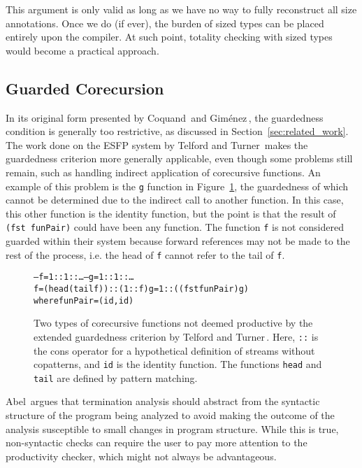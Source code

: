 This argument is only valid as long as we have no way to fully reconstruct all size annotations. Once we do (if ever), the burden of sized types can be placed entirely upon the compiler. At such point, totality checking with sized types would become a practical approach.

\subsection{Guarded Corecursion}
\label{sec:guarded_cored}
In its original form presented by Coquand\,\citep{Coquand94} and Gim\'{e}nez\,\citep{Gimenez95}, the guardedness condition is generally too restrictive, as discussed in Section~\ref{sec:related_work}. The work done on the ESFP system by Telford and Turner\,\citep{Telford97ensuringstreams,Telford98ensuringthe} makes the guardedness criterion more generally applicable, even though some problems still remain, such as handling indirect application of corecursive functions. An example of this problem is the \texttt{g} function in Figure~\ref{fig:TelfordTurnerProblems}, the guardedness of which cannot be determined due to the indirect call to another function. In this case, this other function is the identity function, but the point is that the result of \texttt{(fst~funPair)} could have been any function. The function \texttt{f} is not considered guarded within their system because forward references may not be made to the rest of the process, i.e. the head of \texttt{f} cannot refer to the tail of \texttt{f}.

\begin{figure}
\begin{alltt}
-- f = 1 :: 1 :: \ldots                            -- g = 1 :: 1 :: \ldots
f = (head (tail f)) :: (1 :: f)                 g = 1 :: ((fst funPair) g)
                                                where funPair = (id, id)
\end{alltt}
\caption{Two types of corecursive functions not deemed productive by the extended guardedness criterion by Telford and Turner\,\citep[Section~6.3]{Telford98ensuringthe}. Here, \texttt{::} is the cons operator for a hypothetical definition of streams without copatterns, and \texttt{id} is the identity function. The functions \texttt{head} and \texttt{tail} are defined by pattern matching.} 
\label{fig:TelfordTurnerProblems}
\end{figure}

Abel\,\citep{Abel99terminationchecking} argues that termination analysis should abstract from the syntactic structure of the program being analyzed to avoid making the outcome of the analysis susceptible to small changes in program structure. While this is true, non-syntactic checks can require the user to pay more attention to the productivity checker, which might not always be advantageous. 


